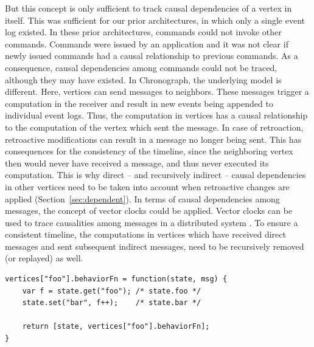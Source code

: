 But this concept is only sufficient to track causal dependencies of a vertex 
in itself. This was sufficient for our prior architectures, in which only a 
single event log existed.
In these prior architectures, commands could not invoke other commands. 
Commands were issued by an application and it was not clear if newly issued 
commands had a causal relationship to previous commands. 
As a consequence, causal dependencies among commands could not be traced, 
although they may have existed. In Chronograph, the underlying model is 
different. Here, vertices can send messages to neighbors. These messages 
trigger a computation in the receiver and result in new events being appended 
to individual event logs. 
Thus, the computation in vertices has a causal relationship to the computation 
of the vertex which sent the message. In case of retroaction, retroactive 
modifications can result in a message no longer being sent. This has 
consequences for the consistency of the timeline, since the neighboring vertex 
then would never have received a message, and thus never executed its 
computation.
This is why direct -- and recursively indirect -- causal dependencies in other 
vertices need to be taken into account when retroactive changes are applied 
(Section~\ref{sec:dependent}). 
In terms of causal dependencies among messages, the concept of vector clocks 
could be applied. Vector clocks can be used to trace causalities among 
messages in a distributed system \cite{Schwarz1994}. 
To ensure a consistent timeline, the computations in vertices which have 
received direct messages and sent subsequent indirect messages, need to be 
recursively removed (or replayed) as well.

\begin{lstlisting}[style=styled,
	caption = {Getter and setter methods can be used to capture causalities 
	among computations. If a retroactive modification is applied, dependent
	computations can be recursively handled. In the case of e.g. a message
	which is retroactively removed, all consequences can be removed from 
	the subsequent timeline as well.},
	label = lst:chrono1
]
vertices["foo"].behaviorFn = function(state, msg) {
	var f = state.get("foo"); /* state.foo */
	state.set("bar", f++);    /* state.bar */

	return [state, vertices["foo"].behaviorFn];
}
\end{lstlisting}


